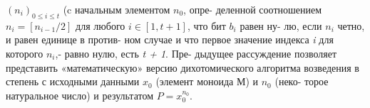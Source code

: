 \noindent $(n_{i})_{0 \leqslant i \leqslant t}$ (c начальным элементом $n_{0}$, опре-\linebreak
деленной соотношением $n_{i} = [n_{i-1} / 2]$ для \linebreak
любого \textit{$i \in [1,t + 1]$}, что бит $b_{i}$ равен ну-\linebreak
лю, если $n_{i}$ четно, и равен единице в против­-\linebreak
ном случае и что первое значение индекса \textit{i} \linebreak
для которого \textit{$n_{i}$},- равно нулю, есть \textit{t + 1}. Пре­-\linebreak
дыдущее рассуждение позволяет представить\linebreak
«математическую» версию дихотомического\linebreak
алгоритма возведения в степень с исходными\linebreak
данными $x_{0}$ (элемент моноида М) и $n_{0}$ (неко­-\linebreak
торое натуральное число) и результатом \textit{$P = x_{0}^{n_{0}}$}.
\newline

